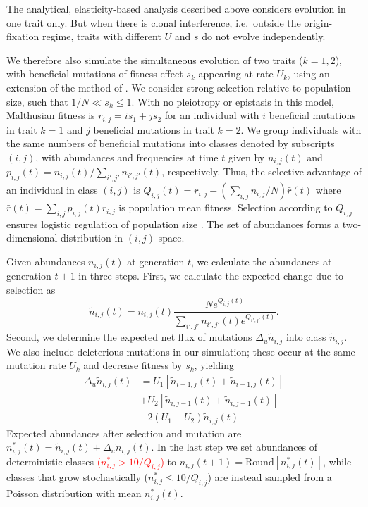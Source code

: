 \documentclass[9pt,twocolumn,twoside]{article}
\begin{document}
The analytical, elasticity-based analysis described above considers evolution in one trait only. But when there is clonal interference, i.e.~outside the origin-fixation regime, traits with different $U$ and $s$ do not evolve independently.

We therefore also simulate the simultaneous evolution of two traits ($k=1,2$), with beneficial mutations of fitness effect $s_k$ appearing at rate $U_k$, using an extension of the method of \citet{gomez2019directional}. We consider strong selection relative to population size, such that $1/N \ll s_k \leq 1$. With no pleiotropy or epistasis in this model, Malthusian fitness is $r_{i,j} = i  s_1 + j s_2$ for an individual with $i$ beneficial mutations in trait $k=1$ and $j$ beneficial mutations in trait $k=2$. We group individuals with the same numbers of beneficial mutations into classes denoted by subscripts $(i,j)$, with abundances and frequencies at time $t$ given by $n_{i,j}(t)$ and $p_{i,j}(t)=n_{i,j}(t)/\sum_{i',j'}n_{i',j'}(t)$, respectively. Thus, the selective advantage of an individual in class $(i,j)$ is $Q_{i,j}(t)=r_{i,j}-(\sum_{i,j}n_{i,j}/N)\bar{r}(t)$ where $\bar{r}(t) = \sum_{i,j} p_{i,j}(t) r_{i,j} $ is population mean fitness. Selection according to $Q_{i,j}$ ensures logistic regulation of population size \citep[][page 27]{Crow1970}. The set of abundances forms a two-dimensional distribution in $(i,j)$ space. 

Given abundances $n_{i,j}(t)$ at generation $t$, we calculate the abundances at generation $t+1$ in three steps. First, we calculate the expected change due to selection as 
\[\tilde{n}_{i,j}(t)=n_{i,j}(t)\frac{Ne^{Q_{i,j}(t)}}{\sum_{i',j'}n_{i',j'}(t)e^{Q_{i',j'}(t)}}.\]
Second, we determine the expected net flux of mutations $\Delta_u \tilde{n}_{i,j}$ into class $\tilde{n}_{i,j}$. We also include deleterious mutations in our simulation; these occur at the same mutation rate $U_k$ and decrease fitness by $s_k$, yielding
\[
\begin{aligned}
\Delta_u \tilde{n}_{i,j}(t) &= U_1 \left [\tilde{n}_{i-1,j}(t)+\tilde{n}_{i+1,j}(t) \right ] \\
&+ U_2 \left [\tilde{n}_{i,j-1}(t)+\tilde{n}_{i,j+1}(t)\right] \\
&-2(U_1 +U_2)\tilde{n}_{i,j}(t)
\end{aligned}
\]
Expected abundances after selection and mutation are $n_{i,j}^*(t) = \tilde{n}_{i,j}(t)+\Delta_u \tilde{n}_{i,j}(t)$.
In the last step we set abundances of deterministic classes \textcolor{red}{($n_{i,j}^*>10/Q_{i,j}$)} to $n_{i,j}(t+1)=\text{Round}\left [n_{i,j}^*(t) \right]$, while classes that grow stochastically ($n_{i,j}^* \leq 10/Q_{i,j}$) are instead sampled from a Poisson distribution with mean $n_{i,j}^*(t)$. 
\end{document}
